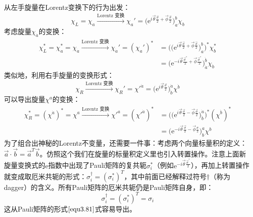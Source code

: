 从左手旋量在Lorentz变换下的行为出发：
\begin{equation}
\label{equ3.201}
	\chi_L = \chi_a \stackrel{\text{Lorentz 变换}}{\longrightarrow} \chi_a' = \Big( \mathrm{e}^{ i\vec{\theta} \frac{\vec{\sigma}}{2} + \vec{\phi} \frac{\vec{\sigma}}{2}  } \Big)^b_a \chi_b
\end{equation}
考虑旋量$\chi_{\dot{a}}$的变换：
\begin{align}
	\chi_L^* = \chi_a^* = \chi_{\dot{a}} \stackrel{\text{Lorentz 变换}}{\longrightarrow} \chi_{\dot{a}}' = (\chi_a')^* &= \bigg( \Big( \mathrm{e}^{ i\vec{\theta} \frac{\vec{\sigma}}{2} + \vec{\phi} \frac{\vec{\sigma}}{2}  } \big)^b_a \Bigg)^* \chi_b^* \nonumber \\
\label{equ3.202}
	&= \bigg( \mathrm{e}^{-i \vec{\theta} \frac{\vec{\sigma}^*}{2} + \vec{\phi} \frac{\vec{\sigma}^*}{2} } \bigg)^{\dot{b}}_{\dot{a}} \chi_{\dot{b}}
\end{align}
类似地，利用右手旋量的变换形式：
\begin{equation}
\label{equ3.203}
	\chi_R \stackrel{\text{Lorentz 变换}}{\longrightarrow} \chi_R' = \chi'^{\dot{a}} = \Big( \mathrm{e}^{ i\vec{\theta} \frac{\vec{\sigma}}{2} } \Big)^{\dot{a}}_{\dot{b}} \chi^{\dot{b}}
\end{equation}
可以导出旋量$\chi^a$的变换：
\begin{align}
	\chi_R^* = (\chi^{\dot{a}})^* = \chi^a \stackrel{\text{Lorentz 变换}}{\longrightarrow} \chi'^a = (\chi'^{\dot{a}})^* &= \bigg( \Big( \mathrm{e}^{ i\vec{\theta} \frac{\vec{\sigma}}{2} - \vec{\phi} \frac{\vec{\sigma}}{2} } \Big)^{\dot{a}}_{\dot{b}} \bigg)^* (\chi^{\dot{b}})^* \nonumber \\
\label{equ3.204}
	&= \bigg( \mathrm{e}^{-i \vec{\theta} \frac{\vec{\sigma}}{2} - \vec{\phi} \frac{\sigma}{2} } \bigg)^{a}_{b} \chi^b
\end{align}
为了组合出神秘的Lorentz不变量，还需要一件事：考虑两个向量标量积的定义：$\vec{a} \cdot \vec{b} = \vec{a}^T \vec{b}$。仿照这个我们在旋量的标量积定义里也引入转置操作。注意上面新旋量变换式的$\mathrm{e}$指数中出现了Pauli矩阵的复共轭$\sigma_i^*$（例如$\mathrm{e}^{ -i \vec{\theta} \frac{\vec{\sigma}^*}{2} }$），再加上转置操作就变成取厄米共轭的形式：$\sigma_i^\dag = (\sigma_i^*)^T$，其中前面已经解释过符号$\dag$（称为dagger）的含义。所有Pauli矩阵的厄米共轭仍是Pauli矩阵自身，即：
\begin{equation}
\label{equ3.205}
	\sigma_i^\dag = (\sigma_i^*)^T = \sigma_i
\end{equation}
这从Pauli矩阵的形式$\ref{equ3.81}$式容易导出。

